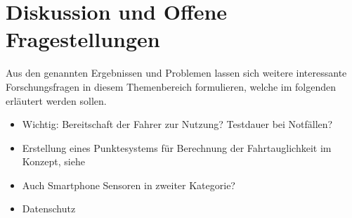 \section{Diskussion und Offene Fragestellungen}
\label{openChallenges}
Aus den genannten Ergebnissen und Problemen lassen sich weitere interessante Forschungsfragen in diesem Themenbereich formulieren, welche im folgenden erläutert werden sollen.

\begin{itemize}
	\item Wichtig: Bereitschaft der Fahrer zur Nutzung? Testdauer bei Notfällen?
	\item Erstellung eines Punktesystems für Berechnung der Fahrtauglichkeit im Konzept, siehe \cite{drivesafe}
	\item Auch Smartphone Sensoren in zweiter Kategorie? \cite{monitoringstressheartrate, bewegungserkennungsensoren}
	\item Datenschutz \cite{beurteilungskriterienleipzig, securityprivacyfitnesstracking}
\end{itemize}
